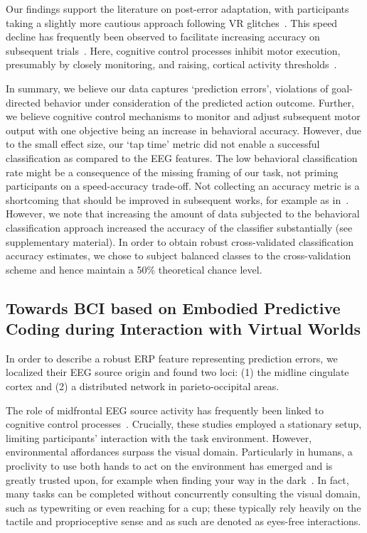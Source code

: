 Our findings support the literature on post-error adaptation, with participants taking a slightly more cautious approach following VR glitches~\cite{Rabbitt1977-yg}. This speed decline has frequently been observed to facilitate increasing accuracy on subsequent trials~\cite{Ridderinkhof2004-rz}. Here, cognitive control processes inhibit motor execution, presumably by closely monitoring, and raising, cortical activity thresholds~\cite{Botvinick2001-bs}.

In summary, we believe our data captures `prediction errors', violations of goal-directed behavior under consideration of the predicted action outcome. Further, we believe cognitive control mechanisms to monitor and adjust subsequent motor output with one objective being an increase in behavioral accuracy. However, due to the small effect size, our `tap time' metric did not enable a successful classification as compared to the EEG features. The low behavioral classification rate might be a consequence of the missing framing of our task, not priming participants on a speed-accuracy trade-off. Not collecting an accuracy metric is a shortcoming that should be improved in subsequent works, for example as in~\cite{Purcell2016-li}. However, we note that increasing the amount of data subjected to the behavioral classification approach increased the accuracy of the classifier substantially (see supplementary material). In order to obtain robust cross-validated classification accuracy estimates, we chose to subject balanced classes to the cross-validation scheme and hence maintain a 50\% theoretical chance level.

\subsection{\textcolor{n}{Towards} BCI based on Embodied Predictive Coding during Interaction with Virtual Worlds}

In order to describe a robust ERP feature representing prediction errors, we localized their EEG source origin and found two loci: (1) the midline cingulate cortex and (2) a distributed network in parieto-occipital areas. 

The role of midfrontal EEG source activity has frequently been linked to cognitive control processes~\cite{Ridderinkhof2004-rz, Cavanagh2014-mm, Cooper2019-im}. Crucially, these studies employed a stationary setup, limiting participants' interaction with the task environment. However, environmental affordances surpass the visual domain. Particularly in humans, a proclivity to use both hands to act on the environment has emerged and is greatly trusted upon, for example when finding your way in the dark~\cite{Gehrke2018-jm, Gehrke2021-ml, Miyakoshi2021-ni}. In fact, many tasks can be completed without concurrently consulting the visual domain, such as typewriting or even reaching for a cup; these typically rely heavily on the tactile and proprioceptive sense and as such are denoted as eyes-free interactions.

